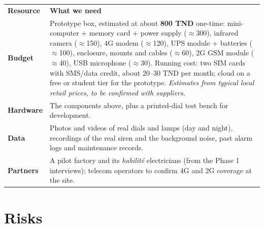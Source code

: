 \documentclass[10pt]{article}
\newcommand{\subhead}[1]{\par\vspace{4pt}{\normalsize\bfseries\color{accent}#1}\par\vspace{2pt}}
\begin{document}
\subhead{Required resources}

\noindent\begin{tabularx}{\linewidth}{>{\bfseries}p{2.3cm} Y}
\textbf{Resource} & \textbf{What we need} \\
Budget &
Prototype box, estimated at about \textbf{800 TND} one-time: mini-computer + memory card + power supply ($\approx$300), infrared camera ($\approx$150), 4G modem ($\approx$120), UPS module + batteries ($\approx$100), enclosure, mounts and cables ($\approx$60), 2G GSM module ($\approx$40), USB microphone ($\approx$30). Running cost: two SIM cards with SMS/data credit, about 20--30 TND per month; cloud on a free or student tier for the prototype. \emph{Estimates from typical local retail prices, to be confirmed with suppliers.} \\
Hardware & The components above, plus a printed-dial test bench for development. \\
Data & Photos and videos of real dials and lamps (day and night), recordings of the real siren and the background noise, past alarm logs and maintenance records. \\
Partners & A pilot factory and its \emph{habilité} electricians (from the Phase 1 interviews); telecom operators to confirm 4G and 2G coverage at the site. \\
\end{tabularx}

\section{Risks}
\vspace{2pt}
\end{document}
